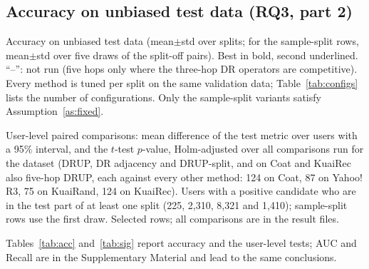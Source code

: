 \subsection{Accuracy on unbiased test data (RQ3, part 2)}\label{sec:acc}

\begin{table}[t]\centering\small
\caption{Accuracy on unbiased test data (mean$\pm$std over splits; for the
sample-split rows, mean$\pm$std over five draws of the split-off pairs). Best in
bold, second underlined. ``--'': not run (five hops only where the three-hop DR
operators are competitive). Every method is tuned per split on the same
validation data; Table~\ref{tab:configs} lists the number of configurations.
Only the sample-split variants satisfy Assumption~\ref{as:fixed}.}\label{tab:acc}
\begin{adjustbox}{max width=\textwidth}

\end{adjustbox}
\end{table}

\begin{table}[t]\centering\small
\caption{User-level paired comparisons: mean difference of the test metric
over users with a 95\% interval, and the $t$-test $p$-value, Holm-adjusted over
all comparisons run for the dataset (DRUP, DR adjacency and DRUP-split, and on Coat and KuaiRec also five-hop DRUP, each
against every other method: 124 on Coat, 87 on Yahoo!\,R3, 75 on KuaiRand, 124 on KuaiRec). Users with a positive
candidate who are in the test part of at least one split (225, 2{,}310, 8{,}321 and
1{,}410); sample-split rows use the first draw. Selected rows; all comparisons
are in the result files.}\label{tab:sig}
\begin{adjustbox}{max width=\textwidth}

\end{adjustbox}
\end{table}

Tables~\ref{tab:acc} and~\ref{tab:sig} report accuracy and the user-level tests;
AUC and Recall are in the Supplementary Material and lead to the same conclusions.

